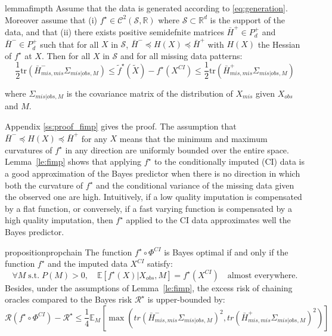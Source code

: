 \documentclass{article}
\newcommand{\RR}{\mathbb{R}}
\newcommand{\E}{\mathbb{E}}
\newcommand{\Ccal}{\mathcal{C}}
\newcommand{\Rcal}{\mathcal{R}}
\newcommand{\Scal}{\mathcal{S}}
\newcommand{\br}[1]{\left(#1\right)}
\newcommand{\sqb}[1]{\left[#1\right]}
\theoremstyle{plain}
\begin{document}
\begin{restatable}{lemma}{fimpth}
\label{le:fimp}
    Assume that the data is generated according to \eqref{eq:generation}. Moreover assume that (i) $f^\star \in \Ccal^2(\Scal, \RR)$ where $\Scal \subset \RR^d$ is the support of the data, and that (ii) there exists positive semidefnite matrices $\bar{H}^+ \in P_d^+$ and $\bar{H}^- \in P_d^+$ such that for all $X$ in $\Scal$, $\bar{H}^- \preccurlyeq H(X) \preccurlyeq \bar{H}^+$ with $H(X)$ the Hessian of $f^\star$ at $X$. Then for all $X$ in $\Scal$ and for all missing data patterns:
    \begin{equation}
        \frac{1}{2}\text{tr}\left(\bar{H}^-_{mis, mis} \Sigma_{mis|obs, M}\right) \leq \tilde f^\star( \widetilde X) - f^\star(X^{CI}) \leq \frac{1}{2}\text{tr}\left(\bar{H}^+_{mis, mis} \Sigma_{mis|obs, M}\right)
    \end{equation}
    
    where $\Sigma_{mis|obs, M}$ is the covariance matrix of the distribution of $X_{mis}$ given $X_{obs}$ and $M$.
\end{restatable}

Appendix \ref{ss:proof_fimp} gives the proof. The assumption that $\bar{H}^- \preccurlyeq H(X) \preccurlyeq \bar{H}^+$ for any $X$ means that the minimum and maximum curvatures of $f^\star$ in any direction are uniformly bounded over the entire space. Lemma~\ref{le:fimp} shows that applying $f^\star$ to the conditionally imputed (CI) data is a good approximation of the Bayes predictor when there is no direction in which both the curvature of $f^\star$ and the conditional variance of the missing data given the observed one are high. Intuitively, if a low quality imputation is compensated by a flat function, or conversely, if a fast varying function is compensated by a high quality imputation, then $f^\star$ applied to the CI data approximates well the Bayes predictor.


\begin{restatable}{proposition}{propchain}
\label{prop:chain}
    The function $f^\star \circ \Phi^{CI}$ is Bayes optimal if and only if the function $f^{\star}$ and the imputed data $X^{CI}$ satisfy:
    \begin{equation}
        \label{eq:bo_cond}
        \forall M \; \text{s.t.} \; P(M)>0, \quad \E\sqb{f^\star(X)|X_{obs}, M} = f^\star(X^{CI}) \quad \text{almost everywhere}.
    \end{equation}
    Besides, 
    under the assumptions of Lemma~\ref{le:fimp}, the excess risk of chaining oracles compared to the Bayes risk $\Rcal^\star$ is upper-bounded by:
    \begin{equation}
    \Rcal(f^\star \circ \Phi^{CI}) - \Rcal^\star \leq \frac{1}{4} \E_M \sqb{ \max \br{tr \br{\bar{H}^-_{mis, mis} \Sigma_{mis|obs, M}}^2, tr\br{\bar{H}^+_{mis, mis} \Sigma_{mis|obs, M}}^2}}
    \label{eq:excess_risk}
    \end{equation}
\end{restatable}
\end{document}
